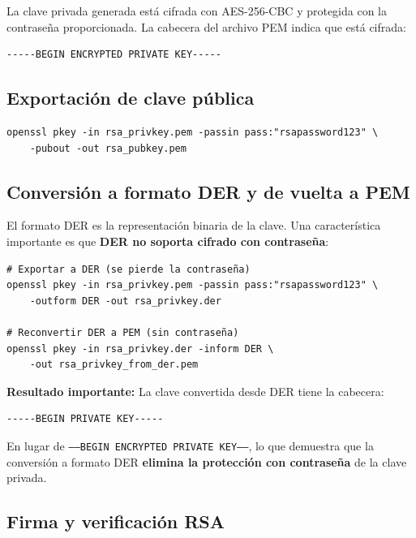 La clave privada generada está cifrada con AES-256-CBC y protegida con la contraseña proporcionada. La cabecera del archivo PEM indica que está cifrada:

\begin{lstlisting}[caption=Cabecera de clave privada cifrada]
-----BEGIN ENCRYPTED PRIVATE KEY-----
\end{lstlisting}

\subsection{Exportación de clave pública}

\begin{lstlisting}[caption=Exportación de clave pública RSA]
openssl pkey -in rsa_privkey.pem -passin pass:"rsapassword123" \
    -pubout -out rsa_pubkey.pem
\end{lstlisting}

\subsection{Conversión a formato DER y de vuelta a PEM}

El formato DER es la representación binaria de la clave. Una característica importante es que \textbf{DER no soporta cifrado con contraseña}:

\begin{lstlisting}[caption=Conversión RSA: PEM $\rightarrow$ DER $\rightarrow$ PEM]
# Exportar a DER (se pierde la contraseña)
openssl pkey -in rsa_privkey.pem -passin pass:"rsapassword123" \
    -outform DER -out rsa_privkey.der

# Reconvertir DER a PEM (sin contraseña)
openssl pkey -in rsa_privkey.der -inform DER \
    -out rsa_privkey_from_der.pem
\end{lstlisting}

\textbf{Resultado importante:} La clave convertida desde DER tiene la cabecera:

\begin{lstlisting}[caption=Cabecera de clave privada sin cifrar]
-----BEGIN PRIVATE KEY-----
\end{lstlisting}

En lugar de \texttt{-----BEGIN ENCRYPTED PRIVATE KEY-----}, lo que demuestra que la conversión a formato DER \textbf{elimina la protección con contraseña} de la clave privada.

\subsection{Firma y verificación RSA}

